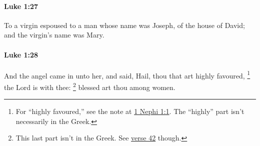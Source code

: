 		\paragraph{Luke 1:27} %
			\label{LUKE-1-27}

			To a virgin espoused to a man whose name was Joseph, of the house of David; and the virgin's name was Mary.

			\begin{framed}
			\scriptsize
				\begin{compactdesc}
					\item[SBLG] 
				\end{compactdesc}
			\end{framed}

		\paragraph{Luke 1:28} %
			\label{LUKE-1-28}

			And the angel came in unto her, and said, Hail, thou that art highly favoured,%
				\footnote{%
					For ``highly favoured,'' see the note at \hyperref[1NEPHI-1-1]{1 Nephi 1:1}. The ``highly'' part isn't necessarily in the Greek.
					}
			the Lord is with thee:
				\footnote{%
					This last part isn't in the Greek. See \hyperref[LUKE-1-42]{verse 42} though.
					}%
			blessed art thou among women.


